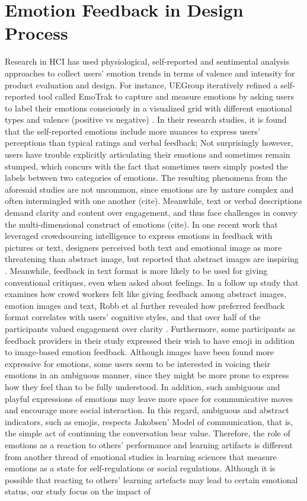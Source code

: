 \documentclass[chi_draft]{sigchi}
\begin{document}
\section{Emotion Feedback in Design Process}
Research in HCI has used physiological, self-reported and sentimental analysis approaches to collect users' emotion trends in terms of valence and intensity for product evaluation and design. For instance, UEGroup iteratively refined a self-reported tool called EmoTrak to capture and measure emotions by asking users to label their emotions consciously in a visualized grid with different emotional types and valence (positive vs negative) \cite{Garcia2016}. In their research studies, it is found that the self-reported emotions include more nuances to express users' perceptions than typical ratings and verbal feedback; Not surprisingly however, users have trouble explicitly articulating their emotions and sometimes remain stumped, which concurs with the fact that sometimes users simply posted the labels between two categories of emotions. The resulting phenomena from the aforesaid studies are not uncommon, since emotions are by nature complex and often intermingled with one another (cite). Meanwhile, text or verbal descriptions demand clarity and content over engagement, and thus face challenges in convey the multi-dimensional construct of emotions (cite). In one recent work that leveraged crowdsourcing intelligence to express emotions in feedback with pictures or text, designers perceived both text and emotional image as more threatening than abstract image, but reported that abstract images are inspiring \cite{Robb2015a}.  Meanwhile, feedback in text format is more likely to be used for giving conventional critiques, even when asked about feelings. In a follow up study that examines how crowd workers felt like giving feedback among abstract images, emotion images and text, Robb et al further revealed how preferred feedback format correlates with users' cognitive styles, and that over half of the participants valued engagement over clarity \cite{Robb2017}. Furthermore, some participants as feedback providers in their study expressed their wish to have emoji in addition to image-based emotion feedback. Although images have been found more expressive for emotions, some users seem to be interested in voicing their emotions in an ambiguous manner, since they might be more prone to express how they feel than to be fully understood. In addition, such ambiguous and playful expressions of emotions may leave more space for communicative moves and encourage more social interaction. In this regard, ambiguous and abstract indicators, such as emojis, respects Jakobsen' Model of communication, that is, the simple act of continuing the conversation bear value. Therefore, the role of emotions as a reaction to others' performance and learning artifacts is different from another thread of emotional studies in learning sciences that measure emotions as a state for self-regulations or social regulations. Although it is possible that reacting to others' learning artefacts may lead to certain emotional status, our study focus on the impact of 
\end{document}
